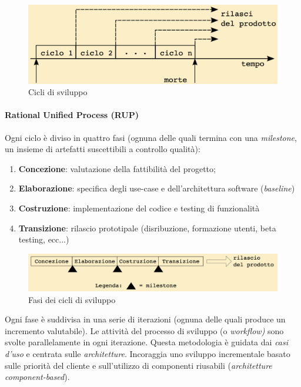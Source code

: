 \begin{figure}[h!]
    \centering
    \includegraphics[width=0.75\linewidth]{assets/up.png}
    \caption{Cicli di sviluppo}
    \label{fig:cicli-up}
\end{figure}

\newpage

\paragraph{Rational Unified Process (RUP)} Ogni ciclo è diviso in quattro fasi (ognuna delle quali termina con una \textit{milestone}, un insieme di artefatti suscettibili a controllo qualità):
\begin{enumerate}
    \item \textbf{Concezione}: valutazione della fattibilità del progetto;
    \item \textbf{Elaborazione}: specifica degli use-case e dell'architettura software (\textit{baseline})
    \item \textbf{Costruzione}: implementazione del codice e testing di funzionalità
    \item \textbf{Transizione}: rilascio prototipale (disribuzione, formazione utenti, beta testing, ecc...)
\end{enumerate}

\begin{figure}[h!]
    \centering
    \includegraphics[width=0.75\linewidth]{assets/rup.png}
    \caption{Fasi dei cicli di sviluppo}
    \label{fig:fasi-rup}
\end{figure}

Ogni fase è suddivisa in una serie di iterazioni (ognuna delle quali produce un incremento valutabile). Le attività del processo di sviluppo (o \textit{workflow)} sono svolte parallelamente in ogni iterazione. Questa metodologia è guidata dai \textit{casi d'uso} e centrata sulle \textit{architetture}. Incoraggia uno sviluppo incrementale basato sulle priorità del cliente e sull'utilizzo di componenti riusabili (\textit{architetture component-based}).

